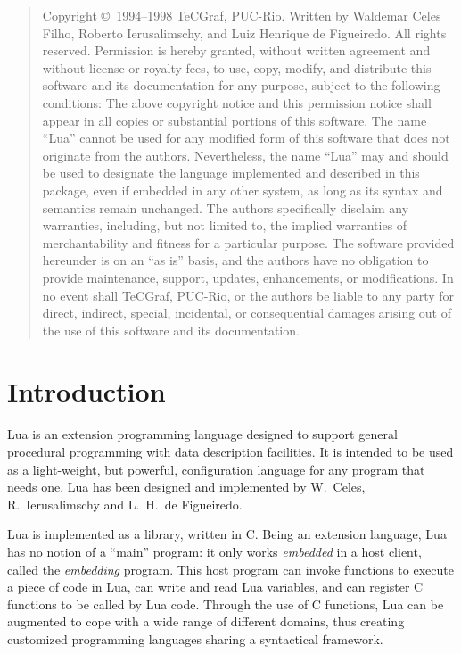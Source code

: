 \vfill
\begin{quotation}
\noindent
\footnotesize
Copyright \copyright\ 1994--1998 TeCGraf, PUC-Rio.
Written by Waldemar Celes Filho,
Roberto Ierusalimschy,
and Luiz Henrique de Figueiredo.
All rights reserved.
%
Permission is hereby granted, without written agreement and without license or
royalty fees, to use, copy, modify, and distribute this software and its
documentation for any purpose, subject to the following conditions:
%
The above copyright notice and this permission notice shall appear in all
copies or substantial portions of this software.
%
The name ``Lua'' cannot be used for any modified form
of this software that does not originate from the authors.
Nevertheless, the name ``Lua'' may and should be
used to designate the language implemented and described in this package,
even if embedded in any other system, as long as its syntax and semantics
remain unchanged.
%
The authors specifically disclaim any warranties, including,
but not limited to, the implied warranties of merchantability
and fitness for a particular purpose.
The software provided hereunder is on an ``as is'' basis, and the
authors have no obligation to provide maintenance, support, updates,
enhancements, or modifications.
In no event shall TeCGraf, PUC-Rio, or the
authors be liable to any party for direct, indirect, special, incidental, or
consequential damages arising out of the use of this software and its
documentation.
\end{quotation}
\vfill

\newpage

\tableofcontents

\newpage
\setcounter{page}{1}
\pagestyle{plain}


\section{Introduction}

Lua is an extension programming language designed to support
general procedural programming with data description
facilities.
It is intended to be used as a light-weight, but powerful,
configuration language for any program that needs one.
Lua has been designed and implemented by
W.~Celes,
R.~Ierusalimschy and
L.~H.~de Figueiredo.

Lua is implemented as a library, written in C.
Being an extension language, Lua has no notion of a ``main'' program:
it only works \emph{embedded} in a host client,
called the \emph{embedding} program.
This host program can invoke functions to execute a piece of
code in Lua, can write and read Lua variables,
and can register C functions to be called by Lua code.
Through the use of C functions, Lua can be augmented to cope with
a wide range of different domains,
thus creating customized programming languages sharing a syntactical framework.


